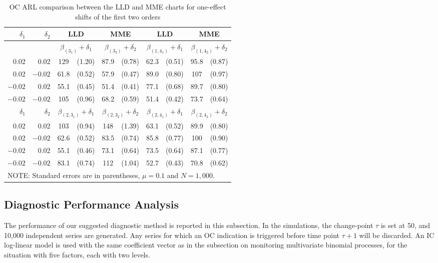 \begin{table}[!ht]
\tabcolsep 7.7pt  \centering \caption{OC ARL comparison between the LLD and MME
charts for one-effect shifts of the first two orders} \vspace{0.3cm}
\renewcommand{\arraystretch}{1.25}
\begin{tabular}{rr|cccc|cccc}\hline
$\delta_1$ & $\delta_2$ & \multicolumn{2}{c}{LLD} & \multicolumn{2}{c|}{MME} &
\multicolumn{2}{c}{LLD} & \multicolumn{2}{c}{MME}
\\\hline
& &\multicolumn{2}{c}{$\beta_{(3_1)}+\delta_1$} &
\multicolumn{2}{c|}{$\beta_{(3_2)}+\delta_2$} &
\multicolumn{2}{c}{$\beta_{(1,4_1)}+\delta_1$} &
\multicolumn{2}{c}{$\beta_{(1,4_2)}+\delta_2$}
\\\hline
0.02 & 0.02 & 129 & (1.20) & 87.9 & (0.78) & 62.3 & (0.51) & 95.8 & (0.87) \\
0.02 & $-0.02$ & 61.8 & (0.52) & 57.9 & (0.47) & 89.0 & (0.80) & 107 & (0.97) \\
$-0.02$ & 0.02 & 55.1 & (0.45) & 51.4 & (0.41) & 77.1 & (0.68) & 89.7 & (0.80) \\
$-0.02$ & $-0.02$ & 105 & (0.96) & 68.2 & (0.59) & 51.4 & (0.42) & 73.7 & (0.64)
\\\hline
$\delta_1$ & $\delta_2$ & \multicolumn{2}{c}{$\beta_{(2,3_1)}+\delta_1$} &
\multicolumn{2}{c|}{$\beta_{(2,3_2)}+\delta_2$} &
\multicolumn{2}{c}{$\beta_{(2,4_1)}+\delta_1$} &
\multicolumn{2}{c}{$\beta_{(2,4_2)}+\delta_2$}
\\\hline
0.02 & 0.02 & 103 & (0.94) & 148 & (1.39) & 63.1 & (0.52) & 89.9 & (0.80) \\
0.02 & $-0.02$ & 62.6 & (0.52) & 83.5 & (0.74) & 85.8 & (0.77) & 100 & (0.90) \\
$-0.02$ & 0.02 & 55.1 & (0.46) & 73.1 & (0.64) & 73.5 & (0.64) & 87.1 & (0.77) \\
$-0.02$ & $-0.02$ & 83.1 & (0.74) & 112 & (1.04) & 52.7 & (0.43) & 70.8 & (0.62)
\\\hline
\multicolumn{10}{l}{NOTE: Standard errors are in parentheses, $\mu=0.1$ and
$N=1,000$.}
\end{tabular}
\end{table}



\subsection{Diagnostic Performance Analysis}

The performance of our suggested diagnostic method is reported in this subsection.
In the simulations, the change-point $\tau$ is set at 50, and 10,000 independent
series are generated. Any series for which an OC indication is triggered before time
point $\tau+1$ will be discarded. An IC log-linear model is used with the same
coefficient vector as in the subsection on monitoring multivariate binomial
processes, for the situation with five factors, each with two levels.

